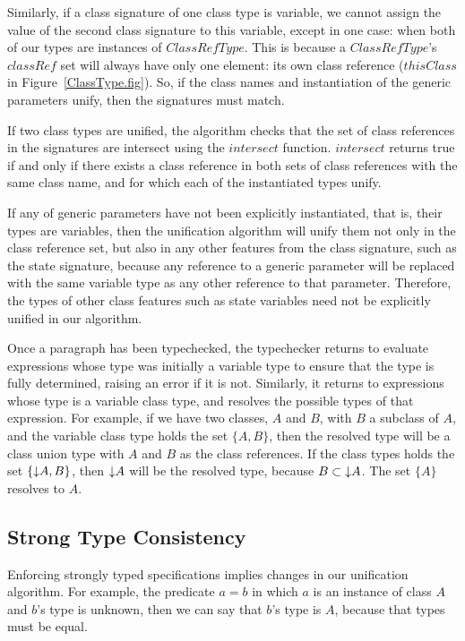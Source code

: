 Similarly, if a class signature of one class type is variable, we
cannot assign the value of the second class signature to this
variable, except in one case: when both of our types are instances of
$ClassRefType$. This is because a $ClassRefType$'s $classRef$ set will
always have only one element: its own class reference ($thisClass$ in
Figure~\ref{ClassType.fig}). So, if the class names and instantiation
of the generic parameters unify, then the signatures must match.

If two class types are unified, the algorithm checks that the set of
class references in the signatures are intersect using the $intersect$
function. $intersect$ returns true if and only if there exists a class
reference in both sets of class references with the same class name,
and for which each of the instantiated types unify.

If any of generic parameters have not been explicitly instantiated,
that is, their types are variables, then the unification algorithm
will unify them not only in the class reference set, but also in any
other features from the class signature, such as the state signature,
because any reference to a generic parameter will be replaced with the
same variable type as any other reference to that
parameter. Therefore, the types of other class features such as state
variables need not be explicitly unified in our algorithm.

Once a paragraph has been typechecked, the typechecker returns to
evaluate expressions whose type was initially a variable type to
ensure that the type is fully determined, raising an error if it is
not. Similarly, it returns to expressions whose type is a variable
class type, and resolves the possible types of that expression. For
example, if we have two classes, $A$ and $B$, with $B$ a subclass of
$A$, and the variable class type holds the set $\{A, B\}$, then the
resolved type will be a class union type with $A$ and $B$ as the class
references. If the class types holds the set $\{\mathord\downarrow A, B\}$, then
$\mathord\downarrow A$ will be the resolved type, because $B \subset \mathord\downarrow A$. The
set $\{A\}$ resolves to $A$.

\subsection{Strong Type Consistency}

Enforcing strongly typed specifications implies changes in our
unification algorithm.  For example, the predicate $a = b$ in which
$a$ is an instance of class $A$ and $b$'s type is unknown, then we can
say that $b$'s type is $A$, because that types must be equal.

